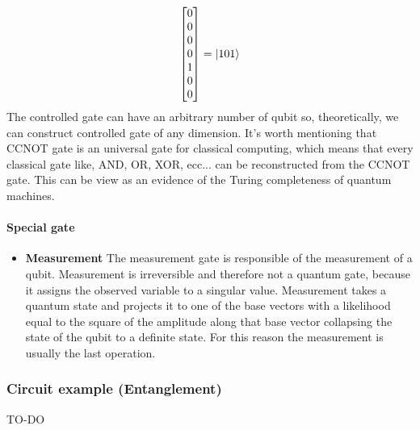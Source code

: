 \documentclass[main.tex]{subfiles}
\theoremstyle{definition}
\begin{document}
\begin{itemize}
$$\begin{bmatrix}
	0\\
	0\\
	0\\
	0\\
	1\\
	0\\
	0\\
	\end{bmatrix}
	=
	\ket{101}
	$$
	The controlled gate can have an arbitrary number of qubit so, theoretically, we can construct controlled gate of 
	any dimension. It's worth mentioning that CCNOT gate is an universal gate for classical computing, which means 
	that every classical gate like, AND, OR, XOR, ecc... can be reconstructed from the CCNOT gate. This can be view 
	as an evidence of the Turing completeness of quantum machines.
	\end{itemize}
	
	\paragraph{Special gate}
	\begin{itemize}
	\item \textbf{Measurement} The measurement gate is responsible of the measurement of a qubit. Measurement is irreversible 
	and therefore not a quantum gate, because it assigns the observed variable to a singular value. Measurement takes a quantum state 
	and projects it to one of the base vectors with a likelihood equal to the square of the amplitude along that base vector collapsing 
	the state of the qubit to a definite state. For this reason the measurement is usually the last operation.
	\end{itemize}
	
	\subsubsection{Circuit example (Entanglement)} TO-DO
	
\end{document}
